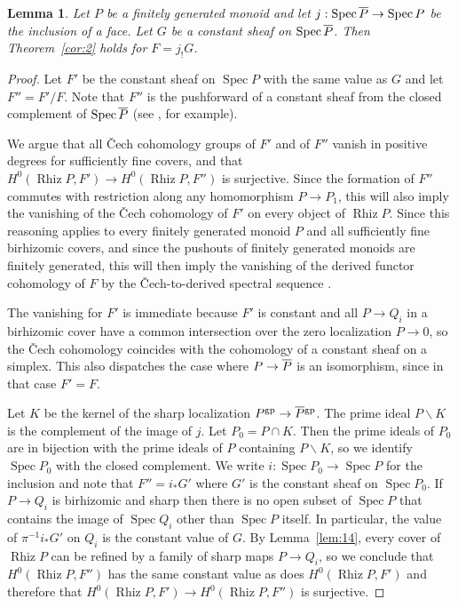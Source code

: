 \documentclass[10pt]{article}
\numberwithin{equation}{section}
\newtheorem{lemma}[paragraph]{Lemma}
\theoremstyle{definition}
\theoremstyle{remark}
\def\Spec{\operatorname{Spec}}
\def\spec{\Spec}
\def\Rh{\operatorname{Rhiz}}
\renewcommand{\bar}[1]{\overnorm{#1}\vphantom{#1}}
\def\overnorm#1{\overline{#1}\vphantom{#1}}
\begin{document}
\begin{lemma} \label{lem:2}
	Let $P$ be a finitely generated monoid and let $j : \spec \bar P \to \spec P$ be the inclusion of a face.  Let $G$ be a constant sheaf on $\spec \bar P$.  Then Theorem~\ref{cor:2} holds for $F = j_! G$.
\end{lemma}
\begin{proof}
	Let $F'$ be the constant sheaf on $\spec P$ with the same value as $G$ and let $F'' = F' / F$.  	Note that $F''$ is the pushforward of a constant sheaf from the closed complement of $\spec \bar P$ (see \cite[\href{https://stacks.math.columbia.edu/tag/02UT}{Tag 02UT}]{stacks-project}, for example).





	We argue that all \v Cech cohomology groups of $F'$ and of $F''$ vanish in positive degrees for sufficiently fine covers, and that $H^0(\Rh P, F') \to H^0(\Rh P, F'')$ is surjective.  Since the formation of 
	$F''$ commutes with restriction along any homomorphism $P \to P_1$, this will also imply the vanishing of the \v Cech cohomology of $F'$ on every object of $\Rh P$.  Since this reasoning applies to every finitely generated monoid $P$ and all sufficiently fine birhizomic covers, and since the pushouts of finitely generated monoids are finitely generated, this will then imply the vanishing of the derived functor cohomology of $F$ by the \v Cech-to-derived spectral sequence \cite[\href{https://stacks.math.columbia.edu/tag/03F9}{Tag 03F9}]{stacks-project}.





	The vanishing for $F'$ is immediate because $F'$ is constant and all $P \to Q_i$ in a birhizomic cover have a common intersection over the zero localization $P \to 0$, so the \v Cech cohomology coincides with the cohomology of a constant sheaf on a simplex.  This also dispatches the case where $P \to \bar P$ is an isomorphism, since in that case $F' = F$.





	Let $K$ be the kernel of the sharp localization $P^{\rm gp} \to \bar P^{\rm gp}$.  The prime ideal $P \smallsetminus K$ is the complement of the image of $j$.  Let $P_0 = P \cap K$.  Then the prime ideals of $P_0$ are in bijection with the prime ideals of $P$ containing $P \smallsetminus K$, so we identify $\spec P_0$ with the closed complement.  We write $i : \spec P_0 \to \spec P$ for the inclusion and note that $F'' = i_\ast G'$ where $G'$ is the constant sheaf on $\spec P_0$.  If $P \to Q_i$ is birhizomic and sharp then there is no open subset of $\spec P$ that contains the image of $\spec Q_i$ other than $\spec P$ itself.  In particular, the value of $\pi^{-1} i_\ast G'$ on $Q_i$ is the constant value of $G$.  By Lemma~\ref{lem:14}, every cover of $\Rh P$ can be refined by a family of sharp maps $P \to Q_i$, so we conclude that $H^0(\Rh P, F'')$ has the same constant value as does $H^0(\Rh P, F')$ and therefore that $H^0(\Rh P, F') \to H^0(\Rh P, F'')$ is surjective.







\end{proof}
\end{document}
